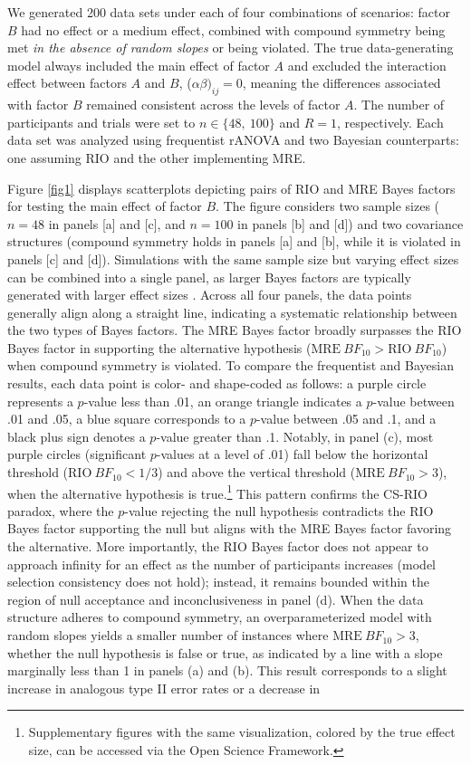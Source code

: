 \documentclass[preprint,12pt,authoryear]{elsarticle}
\begin{document}
We generated 200 data sets under each of four combinations of scenarios: factor $B$ had no effect or a medium effect, combined with compound symmetry being met \textit{in the absence of random slopes} or being violated. The true data-generating model always included the main effect of factor $A$ and excluded the interaction effect between factors $A$ and $B$, ($\alpha\beta)_{ij}=0$, meaning the differences associated with factor $B$ remained consistent across the levels of factor $A$. The number of participants and trials were set to $n\in\{48,\ 100\}$ and $R=1$, respectively. Each data set was analyzed using frequentist rANOVA and two Bayesian counterparts: one assuming RIO and the other implementing MRE.

Figure \ref{fig1} displays scatterplots depicting pairs of RIO and MRE Bayes factors for testing the main effect of factor $B$. The figure considers two sample sizes ($n=48$ in panels [a] and [c], and $n=100$ in panels [b] and [d]) and two covariance structures (compound symmetry holds in panels [a] and [b], while it is violated in panels [c] and [d]). Simulations with the same sample size but varying effect sizes can be combined into a single panel, as larger Bayes factors are typically generated with larger effect sizes \citep{wei_investigating_2023}. Across all four panels, the data points generally align along a straight line, indicating a systematic relationship between the two types of Bayes factors. The MRE Bayes factor broadly surpasses the RIO Bayes factor in supporting the alternative hypothesis ($\text{MRE}\ \mathit{BF}_{10} > \text{RIO}\ \mathit{BF}_{10}$) when compound symmetry is violated. To compare the frequentist and Bayesian results, each data point is color- and shape-coded as follows: a purple circle represents a $p$-value less than .01, an orange triangle indicates a $p$-value between .01 and .05, a blue square corresponds to a $p$-value between .05 and .1, and a black plus sign denotes a $p$-value greater than .1. Notably, in panel (c), most purple circles (significant $p$-values at a level of .01) fall below the horizontal threshold ($\text{RIO}\ \mathit{BF}_{10}<1/3$) and above the vertical threshold ($\text{MRE}\ \mathit{BF}_{10}>3$), when the alternative hypothesis is true.\footnote[7]{Supplementary figures with the same visualization, colored by the true effect size, can be accessed via the Open Science Framework.} This pattern confirms the CS-RIO paradox, where the $p$-value rejecting the null hypothesis contradicts the RIO Bayes factor supporting the null but aligns with the MRE Bayes factor favoring the alternative. More importantly, the RIO Bayes factor does not appear to approach infinity for an effect as the number of participants increases (model selection consistency does not hold); instead, it remains bounded within the region of null acceptance and inconclusiveness in panel (d). When the data structure adheres to compound symmetry, an overparameterized model with random slopes yields a smaller number of instances where $\text{MRE}\ \mathit{BF}_{10}>3$, whether the null hypothesis is false or true, as indicated by a line with a slope marginally less than 1 in panels (a) and (b). This result corresponds to a slight increase in analogous type II error rates or a decrease in 
\end{document}
